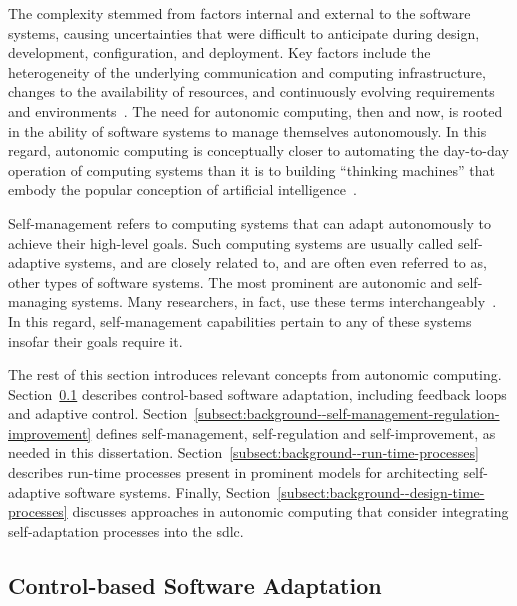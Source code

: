 The complexity stemmed from factors internal and external to the software systems, causing uncertainties that were difficult to anticipate during design, development, configuration, and deployment. Key factors include the heterogeneity of the underlying communication and computing infrastructure, changes to the availability of resources, and continuously evolving requirements and environments~\cite{inverardi-2006-software}. The need for autonomic computing, then and now, is rooted in the ability of software systems to manage themselves autonomously. In this regard, autonomic computing is conceptually closer to automating the day-to-day operation of computing systems than it is to building ``thinking machines'' that embody the popular conception of artificial intelligence~\cite{horn-2001-autonomic}.

Self-management refers to computing systems that can adapt autonomously to achieve their high-level goals. Such computing systems are usually called self-adaptive systems, and are closely related to, and are often even referred to as, other types of software systems. The most prominent are autonomic and self-managing systems. Many researchers, in fact, use these terms interchangeably~\cite{salehie-2009-self-adaptive}. In this regard, self-management capabilities pertain to any of these systems insofar their goals require it.

The rest of this section introduces relevant concepts from autonomic computing. Section~\ref{subsect:background--control-theory} describes control-based software adaptation, including feedback loops and adaptive control. Section~\ref{subsect:background--self-management-regulation-improvement} defines self-management, self-regulation and self-improvement, as needed in this dissertation. Section~\ref{subsect:background--run-time-processes} describes run-time processes present in prominent models for architecting self-adaptive software systems. Finally, Section~\ref{subsect:background--design-time-processes} discusses approaches in autonomic computing that consider integrating self-adaptation processes into the \gls{sdlc}.


\subsection{Control-based Software Adaptation}
\label{subsect:background--control-theory}

